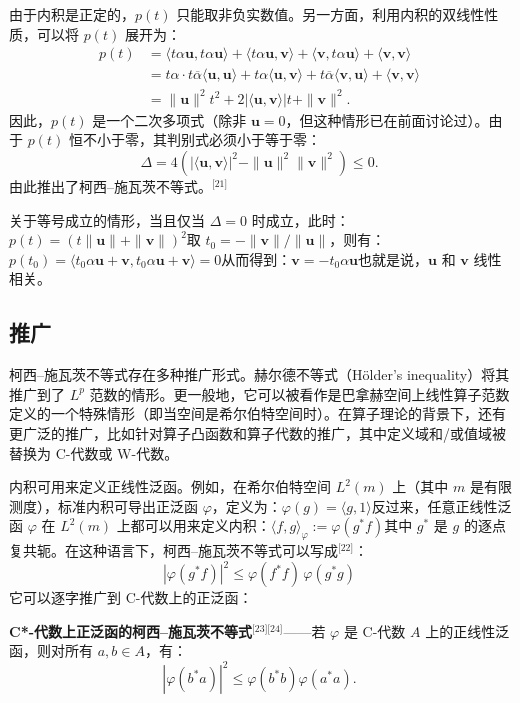 由于内积是正定的，$p(t)$ 只能取非负实数值。另一方面，利用内积的双线性性质，可以将 $p(t)$ 展开为：
$$
\begin{aligned}
p(t) &= \langle t \alpha \mathbf{u}, t \alpha \mathbf{u} \rangle + \langle t \alpha \mathbf{u}, \mathbf{v} \rangle + \langle \mathbf{v}, t \alpha \mathbf{u} \rangle + \langle \mathbf{v}, \mathbf{v} \rangle \\
&= t \alpha \cdot t \overline{\alpha} \langle \mathbf{u}, \mathbf{u} \rangle + t \alpha \langle \mathbf{u}, \mathbf{v} \rangle + t \overline{\alpha} \langle \mathbf{v}, \mathbf{u} \rangle + \langle \mathbf{v}, \mathbf{v} \rangle \\
&= \|\mathbf{u}\|^2 t^2 + 2 |\langle \mathbf{u}, \mathbf{v} \rangle| t + \|\mathbf{v}\|^2.
\end{aligned}~
$$
因此，$p(t)$ 是一个二次多项式（除非 $\mathbf{u} = 0$，但这种情形已在前面讨论过）。由于 $p(t)$ 恒不小于零，其判别式必须小于等于零：
$$
\Delta = 4 \left( |\langle \mathbf{u}, \mathbf{v} \rangle|^2 - \|\mathbf{u}\|^2 \|\mathbf{v}\|^2 \right) \leq 0.~
$$
由此推出了柯西–施瓦茨不等式。\(^\text{[21]}\)

关于等号成立的情形，当且仅当 $\Delta = 0$ 时成立，此时：$p(t) = \left( t \|\mathbf{u}\| + \|\mathbf{v}\| \right)^2$取 $t_0 = -\|\mathbf{v}\|/\|\mathbf{u}\|$，则有：$p(t_0) = \langle t_0 \alpha \mathbf{u} + \mathbf{v}, t_0 \alpha \mathbf{u} + \mathbf{v} \rangle = 0$从而得到：$\mathbf{v} = -t_0 \alpha \mathbf{u}$也就是说，$\mathbf{u}$ 和 $\mathbf{v}$ 线性相关。
\subsection{推广}
柯西–施瓦茨不等式存在多种推广形式。赫尔德不等式（Hölder's inequality）将其推广到了 $L^p$ 范数的情形。更一般地，它可以被看作是巴拿赫空间上线性算子范数定义的一个特殊情形（即当空间是希尔伯特空间时）。在算子理论的背景下，还有更广泛的推广，比如针对算子凸函数和算子代数的推广，其中定义域和/或值域被替换为 C\*-代数或 W\*-代数。

内积可用来定义正线性泛函。例如，在希尔伯特空间 $L^2(m)$ 上（其中 $m$ 是有限测度），标准内积可导出正泛函 $\varphi$，定义为：$\varphi(g) = \langle g, 1 \rangle$反过来，任意正线性泛函 $\varphi$ 在 $L^2(m)$ 上都可以用来定义内积：$
\langle f, g \rangle_{\varphi} := \varphi(g^* f)$其中 $g^*$ 是 $g$ 的逐点复共轭。在这种语言下，柯西–施瓦茨不等式可以写成\(^\text{[22]}\)：
$$
|\varphi(g^* f)|^2 \leq \varphi(f^* f) \, \varphi(g^* g)~
$$
它可以逐字推广到 C\*-代数上的正泛函：

\textbf{C*-代数上正泛函的柯西–施瓦茨不等式}\(^\text{[23][24]}\)——若 $\varphi$ 是 C\*-代数 $A$ 上的正线性泛函，则对所有 $a, b \in A$，有：
$$
\left|\varphi \left(b^{*}a\right)\right|^{2}\leq \varphi \left(b^{*}b\right)\varphi \left(a^{*}a\right).~
$$

